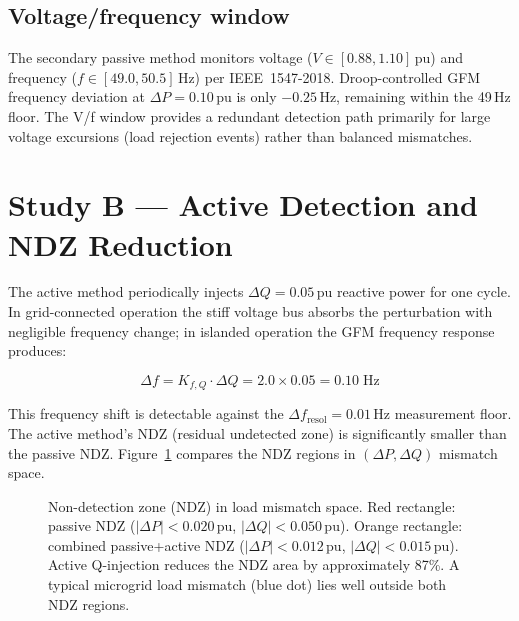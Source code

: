 \documentclass[11pt,a4paper]{article}
\begin{document}
\subsection{Voltage/frequency window}

The secondary passive method monitors voltage ($V\in[0.88,1.10]$\,pu) and
frequency ($f\in[49.0,50.5]$\,Hz) per IEEE~1547-2018.  Droop-controlled GFM
frequency deviation at $\Delta P=0.10$\,pu is only $-0.25$\,Hz, remaining
within the 49\,Hz floor.  The V/f window provides a redundant detection path
primarily for large voltage excursions (load rejection events) rather than
balanced mismatches.

\section{Study B --- Active Detection and NDZ Reduction}
\label{sec:studyB}

The active method periodically injects $\Delta Q = 0.05$\,pu reactive power
for one cycle.  In grid-connected operation the stiff voltage bus absorbs the
perturbation with negligible frequency change; in islanded operation the GFM
frequency response produces:

\begin{equation}
  \Delta f = K_{f,Q} \cdot \Delta Q = 2.0 \times 0.05 = 0.10\;\mathrm{Hz}
\end{equation}

This frequency shift is detectable against the $\Delta f_\mathrm{resol}=0.01$\,Hz
measurement floor.  The active method's NDZ (residual undetected zone) is
significantly smaller than the passive NDZ.  Figure~\ref{fig:ndz} compares the
NDZ regions in $({\Delta P}, {\Delta Q})$ mismatch space.

\begin{figure}[htbp]
  \centering
  \resizebox{0.80\textwidth}{!}{}
  \caption{Non-detection zone (NDZ) in load mismatch space.  Red rectangle:
           passive NDZ ($|\Delta P|<0.020$\,pu, $|\Delta Q|<0.050$\,pu).
           Orange rectangle: combined passive+active NDZ
           ($|\Delta P|<0.012$\,pu, $|\Delta Q|<0.015$\,pu).  Active
           Q-injection reduces the NDZ area by approximately 87\%.
           A typical microgrid load mismatch (blue dot) lies well outside
           both NDZ regions.}
  \label{fig:ndz}
\end{figure}

\end{document}
